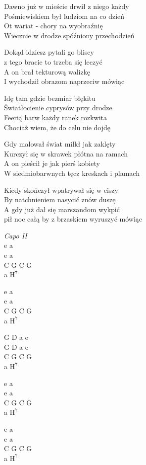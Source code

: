 \begin{text}
    \chordfill
    Dawno już w mieście drwił z niego każdy\\
    Pośmiewiskiem był ludziom na co dzień\\
    Ot wariat - chory na wyobraźnię\\
    Wiecznie w drodze spóźniony przechodzień

    Dokąd idziesz pytali go bliscy\\
    z tego bracie to trzeba się leczyć\\
    A on brał tekturową walizkę\\
    I wychodził obrazom naprzeciw mówiąc

    \vin Idę tam gdzie bezmiar błękitu\\
    \vin Światłocienie cyprysów przy drodze\\
    \vin Feerią barw każdy ranek rozkwita\\
    \vin Chociaż wiem, że do celu nie dojdę

    Gdy malował świat milkł jak zaklęty\\
    Kurczył się w skrawek płótna na ramach\\
    A on pieścił je jak pierś kobiety\\
    W siedmiobarwnych tęcz kreskach i plamach

    Kiedy skończył wpatrywał się w ciszy\\
    By natchnieniem nasycić znów duszę\\
    A gdy już dał się marszandom wykpić\\
    pił noc całą by z brzaskiem wyruszyć mówiąc
\end{text}
\begin{chord}
    \textit{Capo II}\\
    e a\\
    e a\\
    C G C G\\
    a $\mathrm{H^7}$

    e a\\
    e a\\
    C G C G\\
    a $\mathrm{H^7}$

    G D a e\\
    G D a e\\
    C G C G\\
    a $\mathrm{H^7}$

    e a\\
    e a\\
    C G C G\\
    a $\mathrm{H^7}$

    e a\\
    e a\\
    C G C G\\
    a $\mathrm{H^7}$
\end{chord}
